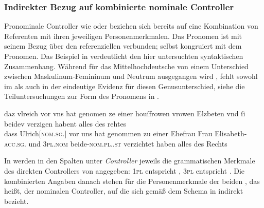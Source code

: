 \subsubsection{Indirekter Bezug auf kombinierte nominale Controller}
\label{subsubsec:beid2p2coordncao}

Pronominale Controller wie   oder  
beziehen sich bereits auf eine Kombination von Referenten mit ihren jeweiligen
Personenmerkmalen. Das Pronomen ist mit seinem Bezug über den referenziellen
 verbunden;  selbst kongruiert mit dem Pronomen. Das
Beispiel in  verdeutlicht den hier untersuchten
syntaktischen Zusammenhang. Während für das  Mittelhochdeutsche
von einem Unterschied zwischen Maskulinum-Femininum  und Neutrum
 ausgegangen wird \autocites[vgl.][213--214]{paul2007}[369,
390--397]{ksw2}, fehlt sowohl im \CAO{} als auch in der \KC{} eindeutige
Evidenz für diesen Genusunterschied, siehe die Teiluntersuchungen zur Form des
Pronomens in .

\begin{exe}
\ex\label{ex:beid2p2coordncao}
	\gll daz vlreich \textelp{} vor vns hat genomen ze einer houſfrowen vrowen
			Elzbeten \textelp{} vnd ſi beidev \textelp{} verzigen habent
			\textelp{} alles des rehtes \\
		dass Ulrich[\textsc{nom.sg.\MascM}] {} vor uns hat genommen zu einer
			Ehefrau Frau Elisabeth-\textsc{acc.sg.\FemF} {} und
			\textsc{3pl\subMF{}.nom} beide-\textsc{nom.pl.\NeutMF.st} {}
			verzichtet haben {} alles des Rechts \\
		\trans {}
				\parencites(Nr.~2843, Salzburg, 1297)[175,22--25]{cao4}
\end{exe}

In  werden in den Spalten unter \emph{Controller}
jeweils die grammatischen Merkmale des direkten Controllers von 
angegeben: \textsc{1pl} entspricht , \textsc{3pl} entspricht
. Die kombinierten Angaben danach stehen für die
Personen\-merkmale der beiden , das heißt, der nominalen
Controller, auf die sich  gemäß dem Schema in
 indirekt bezieht.

